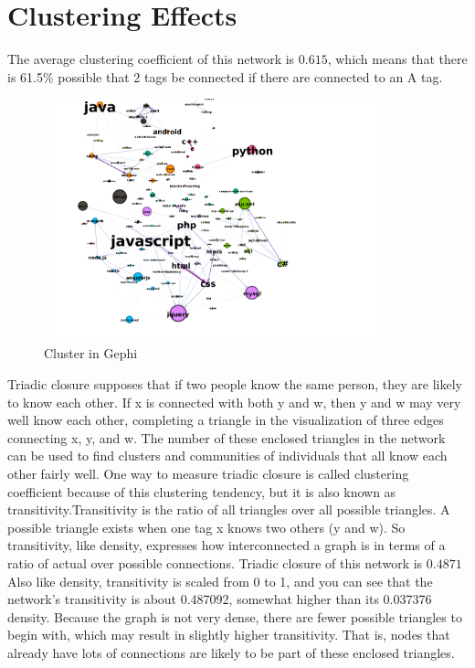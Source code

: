 \documentclass[12pt]{article}
\begin{document}
	\section{Clustering Effects}
		The average clustering coefficient of this network is $0.615$, which means that there is 61.5\% possible that 2 tags be connected if there are connected to an A tag. \\
		\begin{figure}[ht]
			\centering
			\includegraphics[width=10cm,height=7cm]{gephicluster}
			\caption{Cluster in Gephi}
		\end{figure}
		\FloatBarrier
		Triadic closure supposes that if two people know the same person, they are likely to know each other. If x is connected with both y and w, then y and w may very well know each other, completing a triangle in the visualization of three edges connecting x, y, and w. The number of these enclosed triangles in the network can be used to find clusters and communities of individuals that all know each other fairly well. One way to measure triadic closure is called clustering coefficient because of this clustering tendency, but it is also known as transitivity.Transitivity is the ratio of all triangles over all possible triangles. A possible triangle exists when one tag x knows two others (y and w). So transitivity, like density, expresses how interconnected a graph is in terms of a ratio of actual over possible connections.
		Triadic closure of this network is $0.4871$\\
		Also like density, transitivity is scaled from 0 to 1, and you can see that the network’s transitivity is about 0.487092, somewhat higher than its 0.037376 density. Because the graph is not very dense, there are fewer possible triangles to begin with, which may result in slightly higher transitivity. That is, nodes that already have lots of connections are likely to be part of these enclosed triangles.\\
		
\end{document}
